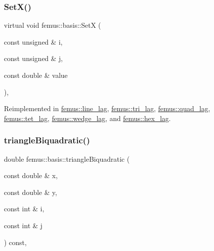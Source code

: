 \mbox{\label{classfemus_1_1basis_abbb9deb1bd0b2d07a4b2995b07d58d2e}} 
\subsubsection{\texorpdfstring{Set\+X()}{SetX()}}
{\footnotesize\ttfamily virtual void femus\+::basis\+::\+SetX (\begin{DoxyParamCaption}\item[{const unsigned \&}]{i,  }\item[{const unsigned \&}]{j,  }\item[{const double \&}]{value }\end{DoxyParamCaption})\hspace{0.3cm}{\ttfamily [inline]}, {\ttfamily [virtual]}}



Reimplemented in \mbox{\hyperlink{classfemus_1_1line__lag_a7b6b910b65c797ed3659b38044c3d1d7}{femus\+::line\+\_\+lag}}, \mbox{\hyperlink{classfemus_1_1tri__lag_aa031dd1be0ccbd6ebdb8d57b3a28d374}{femus\+::tri\+\_\+lag}}, \mbox{\hyperlink{classfemus_1_1quad__lag_a0bd8bb0ef4995d4b70b76e5d92c4c3b2}{femus\+::quad\+\_\+lag}}, \mbox{\hyperlink{classfemus_1_1tet__lag_a776f9fdab9de50b036cc3f30abe85d35}{femus\+::tet\+\_\+lag}}, \mbox{\hyperlink{classfemus_1_1wedge__lag_ad022f16d731698ddaeb7113d01e588cb}{femus\+::wedge\+\_\+lag}}, and \mbox{\hyperlink{classfemus_1_1hex__lag_a74583e35eac434d56a9da2fd00d70038}{femus\+::hex\+\_\+lag}}.

\mbox{\label{classfemus_1_1basis_aaf2a0be4f2d29c434293c40f7b268613}} 
\subsubsection{\texorpdfstring{triangle\+Biquadratic()}{triangleBiquadratic()}}
{\footnotesize\ttfamily double femus\+::basis\+::triangle\+Biquadratic (\begin{DoxyParamCaption}\item[{const double \&}]{x,  }\item[{const double \&}]{y,  }\item[{const int \&}]{i,  }\item[{const int \&}]{j }\end{DoxyParamCaption}) const\hspace{0.3cm}{\ttfamily [inline]}, {\ttfamily [protected]}}

